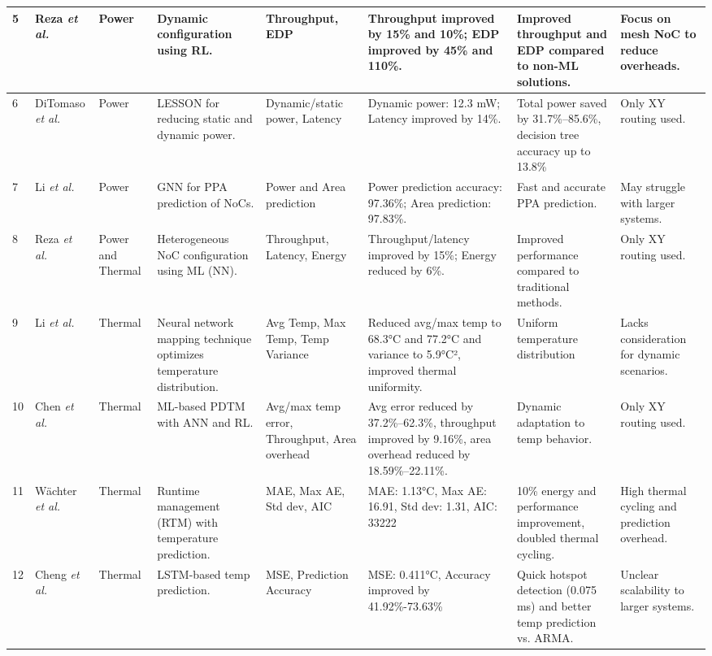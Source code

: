\documentclass[conference]{IEEEtran}
\begin{document}
\begin{table*}[ht]
{\begin{tabularx}{\textwidth}{|p{0.5cm}|p{1.35cm}|p{0.8cm}|X|X|X|X|X|}
\hline
5 & Reza \textit{et al.}\cite{5} & Power & Dynamic configuration using RL. & Throughput, EDP & Throughput improved by 15\% and 10\%; EDP improved by 45\% and 110\%. & Improved throughput and EDP compared to non-ML solutions. & Focus on mesh NoC to reduce overheads. \\ 
\hline
6 & DiTomaso \textit{et al.}\cite{6} & Power & LESSON for reducing static and dynamic power. & Dynamic/static power, Latency & Dynamic power: 12.3 mW; Latency improved by 14\%. & Total power saved by 31.7\%–85.6\%, decision tree accuracy up to 13.8\% & Only XY routing used. \\ 
\hline
7 & Li \textit{et al.}\cite{7} & Power & GNN for PPA prediction of NoCs. & Power and Area prediction & Power prediction accuracy: 97.36\%; Area prediction: 97.83\%. & Fast and accurate PPA prediction. & May struggle with larger systems. \\ 
\hline
8 & Reza \textit{et al.}\cite{8} & Power and Thermal & Heterogeneous NoC configuration using ML (NN). & Throughput, Latency, Energy & Throughput/latency improved by 15\%; Energy reduced by 6\%. & Improved performance compared to traditional methods. & Only XY routing used. \\ 
\hline
9 & Li \textit{et al.}\cite{9} & Thermal & Neural network mapping technique optimizes temperature distribution. & Avg Temp, Max Temp, Temp Variance & Reduced avg/max temp to 68.3°C and 77.2°C and variance to 5.9°C², improved thermal uniformity. & Uniform temperature distribution & Lacks consideration for dynamic scenarios. \\ 
\hline
10 & Chen \textit{et al.}\cite{10} & Thermal & ML-based PDTM with ANN and RL. & Avg/max temp error, Throughput, Area overhead & Avg error reduced by 37.2\%–62.3\%, throughput improved by 9.16\%, area overhead reduced by 18.59\%–22.11\%. & Dynamic adaptation to temp behavior. & Only XY routing used. \\ 
\hline
11 & Wächter \textit{et al.}\cite{11} & Thermal & Runtime management (RTM) with temperature prediction. & MAE, Max AE, Std dev, AIC & MAE: 1.13°C, Max AE: 16.91, Std dev: 1.31, AIC: 33222 & 10\% energy and performance improvement, doubled thermal cycling. & High thermal cycling and prediction overhead. \\ 
\hline
12 & Cheng \textit{et al.}\cite{12} & Thermal & LSTM-based temp prediction. & MSE, Prediction Accuracy & MSE: 0.411°C, Accuracy improved by 41.92\%-73.63\% & Quick hotspot detection (0.075 ms) and better temp prediction vs. ARMA. & Unclear scalability to larger systems. \\ 
\hline
\end{tabularx}
}
\end{table*}
\end{document}
